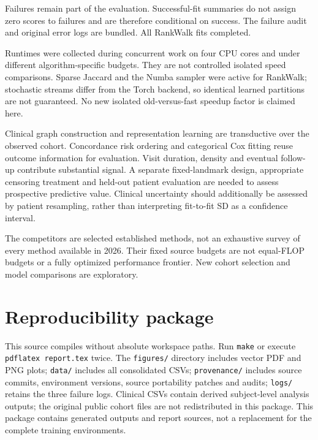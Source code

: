 \documentclass[11pt,a4paper]{article}
\begin{document}
Failures remain part of the evaluation. Successful-fit summaries do not assign zero scores to failures and are therefore conditional on success. The failure audit and original error logs are bundled. All RankWalk fits completed.

Runtimes were collected during concurrent work on four CPU cores and under different algorithm-specific budgets. They are not controlled isolated speed comparisons. Sparse Jaccard and the Numba sampler were active for RankWalk; stochastic streams differ from the Torch backend, so identical learned partitions are not guaranteed. No new isolated old-versus-fast speedup factor is claimed here.

Clinical graph construction and representation learning are transductive over the observed cohort. Concordance risk ordering and categorical Cox fitting reuse outcome information for evaluation. Visit duration, density and eventual follow-up contribute substantial signal. A separate fixed-landmark design, appropriate censoring treatment and held-out patient evaluation are needed to assess prospective predictive value. Clinical uncertainty should additionally be assessed by patient resampling, rather than interpreting fit-to-fit SD as a confidence interval.

The competitors are selected established methods, not an exhaustive survey of every method available in 2026. Their fixed source budgets are not equal-FLOP budgets or a fully optimized performance frontier. New cohort selection and model comparisons are exploratory.

\section{Reproducibility package}
This source compiles without absolute workspace paths. Run \texttt{make} or execute \texttt{pdflatex report.tex} twice. The \texttt{figures/} directory includes vector PDF and PNG plots; \texttt{data/} includes all consolidated CSVs; \texttt{provenance/} includes source commits, environment versions, source portability patches and audits; \texttt{logs/} retains the three failure logs. Clinical CSVs contain derived subject-level analysis outputs; the original public cohort files are not redistributed in this package. This package contains generated outputs and report sources, not a replacement for the complete training environments.
\end{document}
